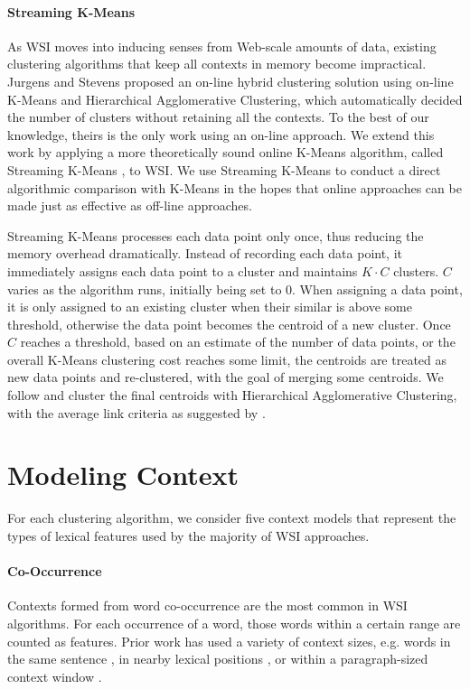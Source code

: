 \documentclass[11pt]{article}
\begin{document}
\paragraph{Streaming K-Means}
As WSI moves into inducing senses from Web-scale amounts of data, existing
clustering algorithms that keep all contexts in memory become impractical.
Jurgens and Stevens  proposed an on-line hybrid
clustering solution using on-line K-Means and Hierarchical Agglomerative
Clustering, which automatically decided the number of clusters without retaining
all the contexts.  To the best of our knowledge, theirs is the only work using
an on-line approach.  We extend this work by applying a more theoretically sound
online K-Means algorithm, called Streaming K-Means \cite{braverman11streaming},
to WSI.  We use Streaming K-Means to conduct a direct algorithmic comparison
with K-Means in the hopes that online approaches can be made just as effective
as off-line approaches.

Streaming K-Means processes each data point only once, thus reducing the memory
overhead dramatically.  Instead of recording each data point, it immediately
assigns each data point to a cluster and maintains $K \cdotp C$ clusters.  $C$ varies
as the algorithm runs, initially being set to 0.  When assigning a data point,
it is only assigned to an existing cluster when their similar is above some
threshold, otherwise the data point becomes the centroid of a new cluster.  Once
$C$ reaches a threshold, based on an estimate of the number of data points, or
the overall K-Means clustering cost reaches some limit, the centroids are
treated as new data points and re-clustered, with the goal of merging some
centroids.  We follow \cite{jurgens10hermit} and cluster the final centroids
with Hierarchical Agglomerative Clustering, with the average link criteria as
suggested by \cite{pedersen97distinguishing}.

\section{Modeling Context}
\label{sec:context}

For each clustering algorithm, we consider five context models that represent
the types of lexical features used by the majority of WSI approaches.

\paragraph{Co-Occurrence} 
Contexts formed from word co-occurrence are the most common in WSI algorithms.
For each occurrence of a word, those words within a certain range are counted as
features. Prior work has used a variety of context sizes, e.g. words in the same
sentence \cite{bordag06word}, in nearby lexical positions
\cite{gauch93experiments}, or within a paragraph-sized context window 
\cite{pedersen10duluth}.
\end{document}

